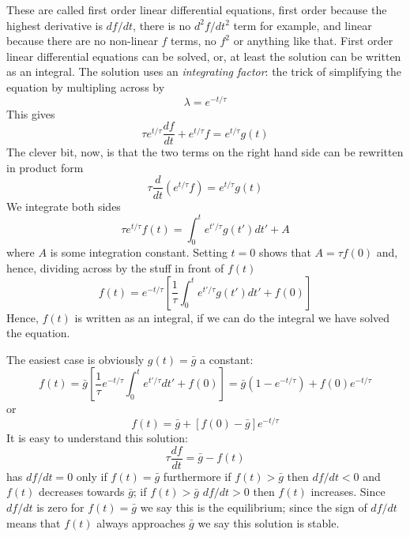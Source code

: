 \documentclass{article}
\begin{document}
These are called first order linear differential equations, first
order because the highest derivative is $df/dt$, there is no
$d^2f/dt^2$ term for example, and linear because there are no
non-linear $f$ terms, no $f^2$ or anything like that. First order
linear differential equations can be solved, or, at least the solution
can be written as an integral. The solution uses an
\textsl{integrating factor}: the trick of simplifying the equation by
multipling across by
\begin{equation}
\lambda=e^{-t/\tau}
\end{equation}
This gives
\begin{equation}
\tau e^{t/\tau}\frac{df}{dt}+e^{t/\tau}f=e^{t/\tau}g(t)
\end{equation}
The clever bit, now, is that the two terms on the right hand side can
be rewritten in product form
\begin{equation}
\tau \frac{d}{dt}\left(e^{t/\tau}f\right)=e^{t/\tau}g(t)
\end{equation}
We integrate both sides
\begin{equation}
\tau e^{t/\tau}f(t)=\int_0^t e^{t'/\tau} g(t')dt'+A
\end{equation}
where $A$ is some integration constant. Setting $t=0$ shows that $A=\tau f(0)$ and, hence, dividing across by the stuff in front of $f(t)$
\begin{equation}
f(t)=e^{-t/\tau}\left[\frac{1}{\tau}\int_0^t e^{t'/\tau} g(t')dt'+f(0)\right]
\end{equation}
Hence, $f(t)$ is written as an integral, if we can do the integral we
have solved the equation.

The easiest case is obviously $g(t)=\bar{g}$ a constant:
\begin{equation}
f(t)= \bar{g} \left[\frac{1}{\tau}e^{-t/\tau}\int_0^t e^{t'/\tau}dt'+f(0)\right]=\bar{g}\left(1-e^{-t/\tau}\right) + f(0)e^{-t/\tau}
\end{equation}
or
\begin{equation}
f(t)=\bar{g}+[f(0)-\bar{g}]e^{-t/\tau}
\end{equation}
It is easy to understand this solution: 
\begin{equation}
\tau\frac{df}{dt}=\bar{g}-f(t)
\end{equation}
has $df/dt=0$ only if $f(t)=\bar{g}$ furthermore if $f(t)>\bar{g}$
then $df/dt<0$ and $f(t)$ decreases towards $\bar{g}$; if
$f(t)>\bar{g}$ $df/dt>0$ then $f(t)$ increases. Since $df/dt$ is zero
for $f(t)=\bar{g}$ we say this is the equilibrium; since the sign of
$df/dt$ means that $f(t)$ always approaches $\bar{g}$ we say this
solution is stable.
\end{document}
